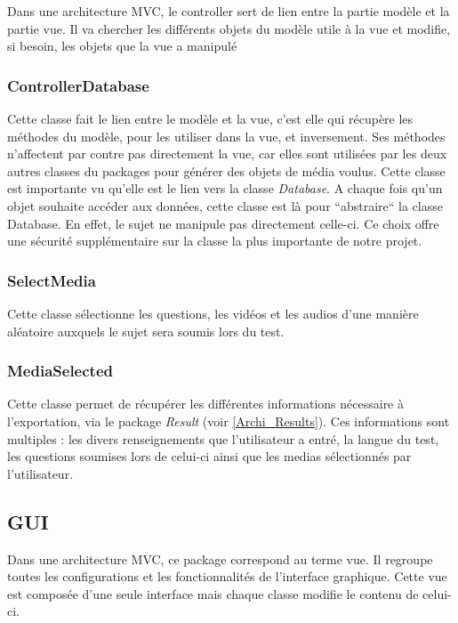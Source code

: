 Dans une architecture MVC, le controller sert de lien entre la partie modèle et la partie vue. Il va chercher les différents objets du modèle utile à la vue et modifie, si besoin, les objets que la vue a manipulé

\subsubsection{ControllerDatabase}

Cette classe fait le lien entre le modèle et la vue, c'est elle qui récupère les méthodes du modèle, pour les utiliser dans la vue, et inversement. Ses méthodes n'affectent par contre pas directement la vue, car elles sont utilisées par les deux autres classes du packages pour générer des objets de média voulus.
Cette classe est importante vu qu'elle est le lien vers la classe \textit{Database}. A chaque fois qu'un objet souhaite accéder aux données, cette classe est là pour ``abstraire`` la classe Database. En effet, le sujet ne manipule pas directement celle-ci. Ce choix offre une sécurité supplémentaire sur la classe la plus importante de notre projet.

\subsubsection{SelectMedia}

Cette classe sélectionne les questions, les vidéos et les audios d'une manière aléatoire auxquels le sujet sera soumis lors du test.

\subsubsection{MediaSelected}

Cette classe permet de récupérer les différentes informations nécessaire à l'exportation, via le package \textit{Result} (voir \ref{Archi_Results}). Ces informations sont multiples : les divers renseignements que l'utilisateur a entré, la langue du test, les questions soumises lors de celui-ci ainsi que les medias sélectionnés par l'utilisateur.


\subsection{GUI}

Dans une architecture MVC, ce package correspond au terme vue. Il regroupe toutes les configurations et les fonctionnalités de l'interface graphique. Cette vue est composée d'une seule interface mais chaque classe modifie le contenu de celui-ci.

